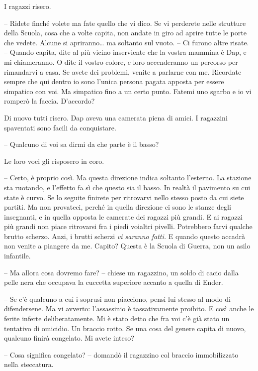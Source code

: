 {I ragazzi risero.}

{-- Ridete finché volete ma fate quello che vi dico. Se vi perderete
	nelle strutture della Scuola, cosa che a volte capita, non andate in
	giro ad aprire tutte le porte che vedete. Alcune si apriranno\ldots{} ma
	soltanto sul vuoto. -- Ci furono altre risate. -- Quando capita, dite al
	più vicino inserviente che la vostra mammina è Dap, e mi chiameranno. O
	dite il vostro colore, e loro accenderanno un percorso per rimandarvi a
	casa. Se avete dei problemi, venite a parlarne con me. Ricordate sempre
	che qui dentro io sono l'unica persona pagata apposta per essere
	simpatico con voi. Ma simpatico fino a un certo punto. Fatemi uno sgarbo
	e io vi romperò la faccia. D'accordo?}

{Di nuovo tutti risero. Dap aveva una camerata piena di amici. I
	ragazzini spaventati sono facili da conquistare.}

{-- Qualcuno di voi sa dirmi da che parte è il basso?}

{Le loro voci gli risposero in coro.}

{-- Certo, è proprio così. Ma questa direzione indica soltanto
	l'esterno. La stazione sta ruotando, e l'effetto fa sì che questo sia il
	basso. In realtà il pavimento su cui state è curvo. Se lo seguite
	finirete per ritrovarvi nello stesso posto da cui siete partiti. Ma non
	provateci, perché in quella direzione ci sono le stanze degli
	insegnanti, e in quella opposta le camerate dei ragazzi più grandi. E ai
	ragazzi più grandi non piace ritrovarsi fra i piedi voialtri pivelli.
	Potrebbero farvi qualche brutto scherzo. Anzi, i brutti scherzi \emph{vi
		saranno fatti.} E quando questo accadrà non venite a piangere da me.
	Capito? Questa è la Scuola di Guerra, non un asilo infantile.}

{-- Ma allora cosa dovremo fare? -- chiese un ragazzino, un soldo di
	cacio dalla pelle nera che occupava la cuccetta superiore accanto a
	quella di Ender.}

{-- Se c'è qualcuno a cui i soprusi non piacciono, pensi lui stesso al
	modo di difendersene. Ma vi avverto: l'assassinio è tassativamente
	proibito. E così anche le ferite inferte deliberatamente. Mi è stato
	detto che fra voi c'è già stato un tentativo di omicidio. Un braccio
	rotto. Se una cosa del genere capita di nuovo, qualcuno finirà
	congelato. Mi avete inteso?}

{-- Cosa significa congelato? -- domandò il ragazzino col braccio
	immobilizzato nella steccatura.}

